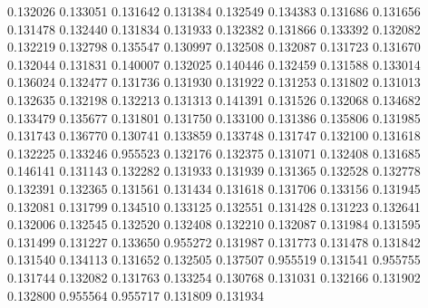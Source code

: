 0.132026
0.133051
0.131642
0.131384
0.132549
0.134383
0.131686
0.131656
0.131478
0.132440
0.131834
0.131933
0.132382
0.131866
0.133392
0.132082
0.132219
0.132798
0.135547
0.130997
0.132508
0.132087
0.131723
0.131670
0.132044
0.131831
0.140007
0.132025
0.140446
0.132459
0.131588
0.133014
0.136024
0.132477
0.131736
0.131930
0.131922
0.131253
0.131802
0.131013
0.132635
0.132198
0.132213
0.131313
0.141391
0.131526
0.132068
0.134682
0.133479
0.135677
0.131801
0.131750
0.133100
0.131386
0.135806
0.131985
0.131743
0.136770
0.130741
0.133859
0.133748
0.131747
0.132100
0.131618
0.132225
0.133246
0.955523
0.132176
0.132375
0.131071
0.132408
0.131685
0.146141
0.131143
0.132282
0.131933
0.131939
0.131365
0.132528
0.132778
0.132391
0.132365
0.131561
0.131434
0.131618
0.131706
0.133156
0.131945
0.132081
0.131799
0.134510
0.133125
0.132551
0.131428
0.131223
0.132641
0.132006
0.132545
0.132520
0.132408
0.132210
0.132087
0.131984
0.131595
0.131499
0.131227
0.133650
0.955272
0.131987
0.131773
0.131478
0.131842
0.131540
0.134113
0.131652
0.132505
0.137507
0.955519
0.131541
0.955755
0.131744
0.132082
0.131763
0.133254
0.130768
0.131031
0.132166
0.131902
0.132800
0.955564
0.955717
0.131809
0.131934
